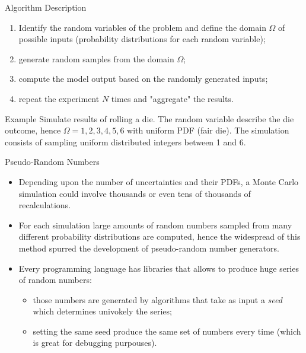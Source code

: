 \documentclass{beamer}
\begin{document}
\begin{frame}{Algorithm Description}
    \begin{enumerate}
    \item Identify the random variables of the problem and define the domain $\Omega$ of possible inputs (probability distributions for each random variable);
    \item generate random samples from the domain $\Omega$;
    \item compute the model output based on the randomly generated inputs;
    \item repeat the experiment $N$ times and "aggregate" the results.
    \end{enumerate}
    \begin{block}{Example}
    Simulate results of rolling a die. The random variable describe the die outcome, hence $\Omega = {1,2,3,4,5,6}$ with uniform PDF (fair die).
    The simulation consists of sampling uniform distributed integers between 1 and 6.
    \end{block}
\end{frame}

\begin{frame}{Pseudo-Random Numbers}
    \begin{itemize}
    \item  Depending upon the number of uncertainties and their PDFs, a Monte Carlo simulation could involve thousands or even tens of thousands of recalculations.
    \item For each simulation large amounts of random numbers sampled from many different probability distributions are computed, hence the widespread of this method spurred the development of pseudo-random number generators. 
    \item Every programming language has libraries that allows to produce huge series of random numbers:
    \begin{itemize}
        \item those numbers are generated by algorithms that take as input a \emph{seed} which determines univokely the series; 
        \item setting the same seed produce the same set of numbers every time (which is great for debugging purpouses).
    \end{itemize}
    \end{itemize}
\end{frame}
\end{document}
